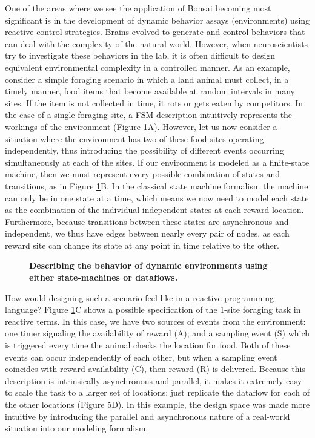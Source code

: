 One of the areas where we see the application of Bonsai becoming most significant is in the development of dynamic behavior assays (environments) using reactive control strategies. Brains evolved to generate and control behaviors that can deal with the complexity of the natural world. However, when neuroscientists try to investigate these behaviors in the lab, it is often difficult to design equivalent environmental complexity in a controlled manner. As an example, consider a simple foraging scenario in which a land animal must collect, in a timely manner, food items that become available at random intervals in many sites. If the item is not collected in time, it rots or gets eaten by competitors. In the case of a single foraging site, a FSM description intuitively represents the workings of the environment (Figure \ref{fig:bonsaiStateMachine}A). However, let us now consider a situation where the environment has two of these food sites operating independently, thus introducing the possibility of different events occurring simultaneously at each of the sites. If our environment is modeled as a finite-state machine, then we must represent every possible combination of states and transitions, as in Figure \ref{fig:bonsaiStateMachine}B. In the classical state machine formalism the machine can only be in one state at a time, which means we now need to model each state as the combination of the individual independent states at each reward location. Furthermore, because transitions between these states are asynchronous and independent, we thus have edges between nearly every pair of nodes, as each reward site can change its state at any point in time relative to the other.

\begin{figure}
\begin{center}
\scalebox{0.35}{}
\end{center}
\vspace{-5mm}
\caption{\textbf{Describing the behavior of dynamic environments using either state-machines or dataflows.}}
\label{fig:bonsaiStateMachine}
\end{figure}

How would designing such a scenario feel like in a reactive programming language? Figure \ref{fig:bonsaiStateMachine}C shows a possible specification of the 1-site foraging task in reactive terms. In this case, we have two sources of events from the environment: one timer signaling the availability of reward (A); and a sampling event (S) which is triggered every time the animal checks the location for food. Both of these events can occur independently of each other, but when a sampling event coincides with reward availability (C), then reward (R) is delivered. Because this description is intrinsically asynchronous and parallel, it makes it extremely easy to scale the task to a larger set of locations: just replicate the dataflow for each of the other locations (Figure 5D). In this example, the design space was made more intuitive by introducing the parallel and asynchronous nature of a real-world situation into our modeling formalism.


